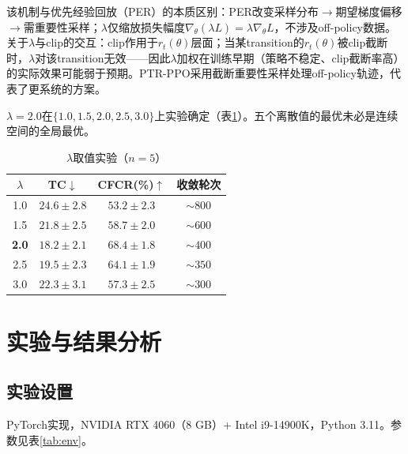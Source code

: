 \documentclass[12pt,a4paper,UTF8]{ctexart}
\begin{document}
该机制与优先经验回放（PER）的本质区别：PER改变采样分布$\to$期望梯度偏移$\to$需重要性采样；$\lambda$仅缩放损失幅度$\nabla_\theta(\lambda L)=\lambda\nabla_\theta L$，不涉及off-policy数据。关于$\lambda$与clip的交互：clip作用于$r_t(\theta)$层面；当某transition的$r_t(\theta)$被clip截断时，$\lambda$对该transition无效——因此$\lambda$加权在训练早期（策略不稳定、clip截断率高）的实际效果可能弱于预期。PTR-PPO\cite{ref27}采用截断重要性采样处理off-policy轨迹，代表了更系统的方案。

$\lambda=2.0$在$\{1.0,1.5,2.0,2.5,3.0\}$上实验确定（表\ref{tab:lambda}）。五个离散值的最优未必是连续空间的全局最优。

\begin{table}[H]
    \centering
    \caption{$\lambda$取值实验（$n=5$）}
    \label{tab:lambda}
    \begin{tabular}{|c|c|c|c|}
        \hline
        $\lambda$ & TC$\downarrow$ & CFCR(\%)$\uparrow$ & 收敛轮次 \\
        \hline
        1.0 & $24.6\pm2.8$ & $53.2\pm2.3$ & $\sim800$ \\
        1.5 & $21.8\pm2.5$ & $58.7\pm2.0$ & $\sim600$ \\
        \textbf{2.0} & $\mathbf{18.2\pm2.1}$ & $\mathbf{68.4\pm1.8}$ & $\sim400$ \\
        2.5 & $19.5\pm2.3$ & $64.1\pm1.9$ & $\sim350$ \\
        3.0 & $22.3\pm3.1$ & $57.3\pm2.5$ & $\sim300$ \\
        \hline
    \end{tabular}
\end{table}

\section{实验与结果分析}

\subsection{实验设置}

PyTorch实现，NVIDIA RTX 4060（8 GB）+ Intel i9-14900K，Python 3.11。参数见表\ref{tab:env}。
\end{document}
